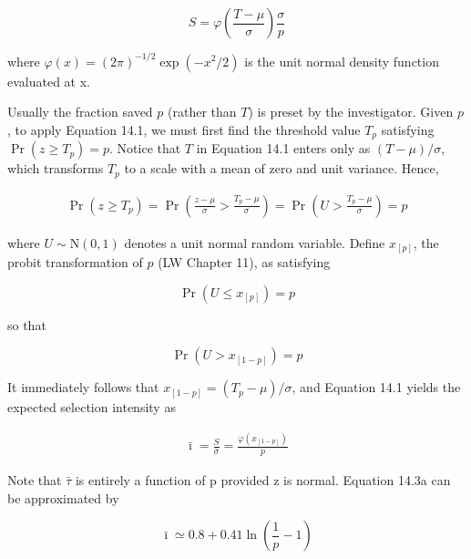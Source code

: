 \documentclass{article}
\begin{document}
\begin{equation}
S=\varphi\left(\frac{T-\mu}{\sigma}\right)\frac{\sigma}{p}
\tag{14.1}
\label{eq:14_1}
\end{equation}

where  $ \varphi(x)=(2\pi)^{-1/2}\exp(-x^{2}/2) $ is the unit normal density function evaluated at x.

Usually the fraction saved $p$ (rather than $T$) is preset by the investigator. Given $p$, to apply Equation 14.1, we must first find the threshold value $T_p$ satisfying $\Pr(z \geq T_p) = p$. Notice that $T$ in Equation 14.1 enters only as $(T - \mu)/\sigma$, which transforms $T_p$ to a scale with a mean of zero and unit variance. Hence,

\begin{equation}
\begin{align*}\Pr(z\geq T_p)=\Pr\left(\frac{z-\mu}{\sigma}>\frac{T_p-\mu}{\sigma}\right)=\Pr\left(U>\frac{T_p-\mu}{\sigma}\right)=p\end{align*}
\end{equation}

where  $ U \sim \mathrm{N}(0,1) $ denotes a unit normal random variable. Define  $ x_{[p]} $, the probit transformation of  $ p $ (LW Chapter 11), as satisfying

\begin{equation}
\Pr(U\leq x_{[p]})=p
\tag{14.2a}
\label{eq:14_2a}
\end{equation}

so that

\begin{equation}
\Pr(U>x_{[1-p]})=p
\tag{14.2b}
\label{eq:14_2b}
\end{equation}

It immediately follows that  $ x_{[1-p]} = (T_p - \mu)/\sigma $, and Equation 14.1 yields the expected selection intensity as

\begin{equation}
\begin{align*}\bar\imath=\frac{S}{\sigma}=\frac{\varphi(x_{[1-p]})}{p}\end{align*}
\tag{14.3a}
\label{eq:14_3a}
\end{equation}

Note that  $ \bar{\tau} $ is entirely a function of p provided z is normal. Equation 14.3a can be approximated by

\begin{equation}
\bar{\imath}\simeq0.8+0.41\ln\left(\frac{1}{p}-1\right)
\tag{14.3b}
\label{eq:14_3b}
\end{equation}
\end{document}
